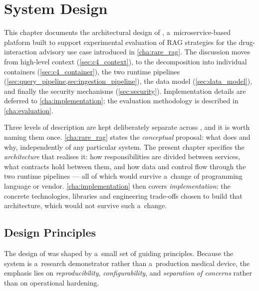 \chapter{System Design}
\label{cha:system_design}

This chapter documents the architectural design of \medrag{}, a~microservice-based
platform built to support experimental evaluation of RAG strategies for the
drug-interaction advisory use case introduced in \cref{cha:rare_rag}.
The discussion moves from high-level context (\cref{sec:c4_context}), to the
decomposition into individual containers (\cref{sec:c4_container}), the two runtime
pipelines (\cref{sec:query_pipeline,sec:ingestion_pipeline}), the data model
(\cref{sec:data_model}), and finally the security mechanisms (\cref{sec:security}).
Implementation details are deferred to \cref{cha:implementation};
the evaluation methodology is described in \cref{cha:evaluation}.

Three levels of description are kept deliberately separate across
, and it is worth naming them once.
\cref{cha:rare_rag} states the \emph{conceptual} proposal: what \rarerag{} does and
why, independently of any particular system.
The present chapter specifies the \emph{architecture} that realises it: how
responsibilities are divided between services, what contracts hold between them,
and how data and control flow through the two runtime pipelines --- all of which
would survive a~change of programming language or vendor.
\cref{cha:implementation} then covers \emph{implementation}: the concrete
technologies, libraries and engineering trade-offs chosen to build that
architecture, which would not survive such a~change.

\section{Design Principles}
\label{sec:design_principles}

The design of \medrag{} was shaped by a~small set of guiding principles.
Because the system is a~research demonstrator rather than a~production medical device,
the emphasis lies on \emph{reproducibility}, \emph{configurability}, and
\emph{separation of concerns} rather than on operational hardening.

